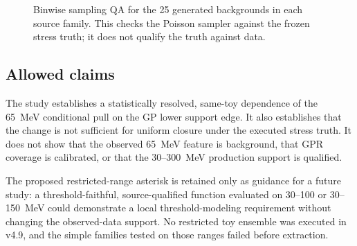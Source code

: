 \begin{figure}[H]
\centering
{}
\caption{Binwise sampling QA for the 25 generated backgrounds in each source family.
This checks the Poisson sampler against the frozen stress truth; it does not qualify
the truth against data.}
\label{fig:v4p9-sampling}
\end{figure}

\subsection{Allowed claims}

The study establishes a statistically resolved, same-toy dependence of the 65~MeV
conditional pull on the GP lower support edge.  It also establishes that the change is
not sufficient for uniform closure under the executed stress truth.  It does not show
that the observed 65~MeV feature is background, that GPR coverage is calibrated, or
that the 30--300~MeV production support is qualified.

The proposed restricted-range asterisk is retained only as guidance for a future
study: a threshold-faithful, source-qualified function evaluated on 30--100 or
30--150~MeV could demonstrate a local threshold-modeling requirement without changing
the observed-data support.  No restricted toy ensemble was executed in v4.9, and the
simple families tested on those ranges failed before extraction.
